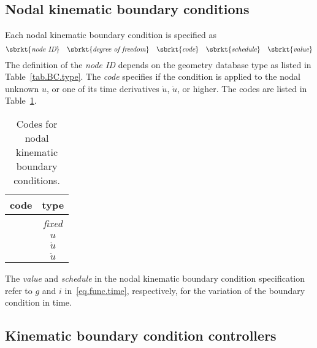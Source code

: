 \subsection{Nodal kinematic boundary conditions}
\label{set.ICandBC.KBC}
Each nodal kinematic boundary condition is specified as
\[
\sbrkt{\textit{node ID}} \quad 
\sbrkt{\textit{degree of freedom}} \quad
\sbrkt{\textit{code}} \quad
\sbrkt{\textit{schedule}} \quad
\sbrkt{\textit{value}} 
\]
The definition of the \textit{node ID} depends on the geometry 
database type as listed in Table~\ref{tab.BC.type}. The \textit{code} 
specifies if the condition is applied to the nodal unknown $u$, or one 
of its time derivatives $\dot{u}$, $\ddot{u}$, or higher. The codes 
are listed in Table~\ref{tab.KBC.code}.
\begin{table}[h]
\begin{center}
\caption{\label{tab.KBC.code} Codes for nodal kinematic boundary 
conditions.}
\begin{tabular}[c]{|c|c|}
\hline
 \parbox[b]{0.75in}{\centering \textbf{code}}
&\parbox[b]{0.75in}{\centering \textbf{type}}\\
\hline
 \parbox[b]{0.75in}{}
&\parbox[b]{0.75in}{\centering \textit{fixed}}\\
\hline
 \parbox[b]{0.75in}{}
&\parbox[b]{0.75in}{\centering $u$}\\
\hline
 \parbox[b]{0.75in}{}
&\parbox[b]{0.75in}{\centering $\dot{u}$}\\
\hline
 \parbox[b]{0.75in}{}
&\parbox[b]{0.75in}{\centering $\ddot{u}$}\\
\hline
\end{tabular}
\end{center}
\end{table}
The \textit{value} and \textit{schedule} in the nodal kinematic 
boundary condition specification refer to 
$g$ and $i$ in~\eqref{eq.func.time}, respectively, for the variation 
of the boundary condition in time.

\subsection{Kinematic boundary condition controllers}
\label{set.ICandBC.KBC.controller}

